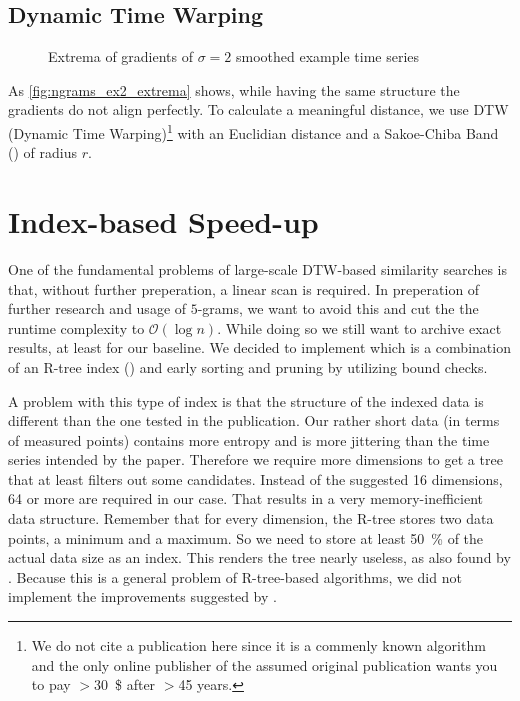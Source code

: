 \subsection{Dynamic Time Warping}
\label{ssec:baseline:sim:dtw}

\begin{figure}
    \centering
    
    \caption{Extrema of gradients of $\sigma = 2$ smoothed example time series}
    \label{fig:ngrams_ex2_extrema}
\end{figure}

As \autoref{fig:ngrams_ex2_extrema} shows, while having the same structure the gradients do not align perfectly. To calculate a meaningful distance, we use DTW (Dynamic Time Warping)\footnote{We do not cite a publication here since it is a commenly known algorithm and the only online publisher of the assumed original publication wants you to pay $>$\SI{30}{\$} after $>$\num{45} years.} with an Euclidian distance and a Sakoe-Chiba Band (\cite{sakoe}) of radius $r$.

\section{Index-based Speed-up}
\label{sec:baseline:speed}

One of the fundamental problems of large-scale DTW-based similarity searches is that, without further preperation, a linear scan is required. In preperation of further research and usage of $5$-grams, we want to avoid this and cut the the runtime complexity to $\mathcal{O}(\log{n})$. While doing so we still want to archive exact results, at least for our baseline. We decided to implement \cite{LB_Keogh} which is a combination of an R-tree index (\cite{rtree}) and early sorting and pruning by utilizing bound checks.

A problem with this type of index is that the structure of the indexed data is different than the one tested in the publication. Our rather short data (in terms of measured points) contains more entropy and is more jittering than the time series intended by the paper. Therefore we require more dimensions to get a tree that at least filters out some candidates. Instead of the suggested \num{16} dimensions, \num{64} or more are required in our case. That results in a very memory-inefficient data structure. Remember that for every dimension, the R-tree stores two data points, a minimum and a maximum. So we need to store at least \SI{50}{\percent} of the actual data size as an index. This renders the tree nearly useless, as also found by \cite{rtree_highdim}. Because this is a general problem of R-tree-based algorithms, we did not implement the improvements suggested by \cite{LB_Improved}.
